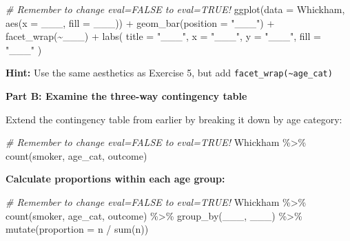 \documentclass[]{tufte-handout}
\newenvironment{Shaded}{}{}
\newcommand{\AttributeTok}[1]{\textcolor[rgb]{0.49,0.56,0.16}{#1}}
\newcommand{\CommentTok}[1]{\textcolor[rgb]{0.38,0.63,0.69}{\textit{#1}}}
\newcommand{\FunctionTok}[1]{\textcolor[rgb]{0.02,0.16,0.49}{#1}}
\newcommand{\NormalTok}[1]{#1}
\newcommand{\SpecialCharTok}[1]{\textcolor[rgb]{0.25,0.44,0.63}{#1}}
\newcommand{\StringTok}[1]{\textcolor[rgb]{0.25,0.44,0.63}{#1}}
\begin{document}
\begin{Shaded}
\begin{Highlighting}[]
\CommentTok{\# Remember to change eval=FALSE to eval=TRUE!}
\FunctionTok{ggplot}\NormalTok{(}\AttributeTok{data =}\NormalTok{ Whickham, }\FunctionTok{aes}\NormalTok{(}\AttributeTok{x =}\NormalTok{ \_\_\_, }\AttributeTok{fill =}\NormalTok{ \_\_\_)) }\SpecialCharTok{+}
  \FunctionTok{geom\_bar}\NormalTok{(}\AttributeTok{position =} \StringTok{"\_\_\_"}\NormalTok{) }\SpecialCharTok{+}
  \FunctionTok{facet\_wrap}\NormalTok{(}\SpecialCharTok{\textasciitilde{}}\NormalTok{\_\_\_) }\SpecialCharTok{+}
  \FunctionTok{labs}\NormalTok{(}
    \AttributeTok{title =} \StringTok{"\_\_\_"}\NormalTok{,}
    \AttributeTok{x =} \StringTok{"\_\_\_"}\NormalTok{,}
    \AttributeTok{y =} \StringTok{"\_\_\_"}\NormalTok{,}
    \AttributeTok{fill =} \StringTok{"\_\_\_"}
\NormalTok{  )}
\end{Highlighting}
\end{Shaded}

\textbf{Hint:} Use the same aesthetics as Exercise 5, but add
\texttt{facet\_wrap(\textasciitilde{}age\_cat)}

\textbf{Part B: Examine the three-way contingency table}

Extend the contingency table from earlier by breaking it down by age
category:

\begin{Shaded}
\begin{Highlighting}[]
\CommentTok{\# Remember to change eval=FALSE to eval=TRUE!}
\NormalTok{Whickham }\SpecialCharTok{\%\textgreater{}\%}
  \FunctionTok{count}\NormalTok{(smoker, age\_cat, outcome)}
\end{Highlighting}
\end{Shaded}

\textbf{Calculate proportions within each age group:}

\begin{Shaded}
\begin{Highlighting}[]
\CommentTok{\# Remember to change eval=FALSE to eval=TRUE!}
\NormalTok{Whickham }\SpecialCharTok{\%\textgreater{}\%}
  \FunctionTok{count}\NormalTok{(smoker, age\_cat, outcome) }\SpecialCharTok{\%\textgreater{}\%}
  \FunctionTok{group\_by}\NormalTok{(\_\_\_, \_\_\_) }\SpecialCharTok{\%\textgreater{}\%}
  \FunctionTok{mutate}\NormalTok{(}\AttributeTok{proportion =}\NormalTok{ n }\SpecialCharTok{/} \FunctionTok{sum}\NormalTok{(n))}
\end{Highlighting}
\end{Shaded}
\end{document}

